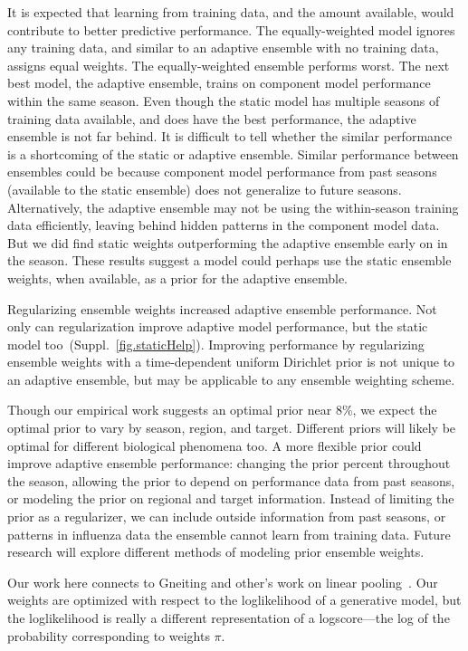\documentclass[12pt]{article}
\begin{document}
It is expected that learning from training data, and the amount available, would contribute to better predictive performance.
The equally-weighted model ignores any training data, and similar to an adaptive ensemble with no training data, assigns equal weights.
The equally-weighted ensemble performs worst.
The next best model, the adaptive ensemble, trains on component model performance within the same season.
Even though the static model has multiple seasons of training data available, and does have the best performance, the adaptive ensemble is not far behind.
It is difficult to tell whether the similar performance is a shortcoming of the static or adaptive ensemble.
Similar performance between ensembles could be because component model performance from past seasons (available to the static ensemble) does not generalize to future seasons.
Alternatively, the adaptive ensemble may not be using the within-season training data efficiently, leaving behind hidden patterns in the component model data. 
But we did find static weights outperforming the adaptive ensemble early on in the season.
These results suggest a model could perhaps use the static ensemble weights, when available, as a prior for the adaptive ensemble.

Regularizing ensemble weights increased adaptive ensemble performance.
Not only can regularization improve adaptive model performance, but the static model too~(Suppl.~\ref{fig.staticHelp}).
Improving performance by regularizing ensemble weights with a time-dependent uniform Dirichlet prior is not unique to an adaptive ensemble, but may be applicable to any ensemble weighting scheme. 

Though our empirical work suggests an optimal prior near 8\%, we expect the optimal prior to vary by season, region, and target.
Different priors will likely be optimal for different biological phenomena too.
%
A more flexible prior could improve adaptive ensemble performance:
changing the prior percent throughout the season, allowing the prior to depend on performance data from past seasons, or modeling the prior on regional and target information.
Instead of limiting the prior as a regularizer, we can include outside information from past seasons, or patterns in influenza data the ensemble cannot learn from training data.
Future research will explore different methods of modeling prior ensemble weights.

Our work here connects to Gneiting and other's work on linear pooling~\cite{ranjan2010combining,gneiting2013combining,geweke2011optimal,wallis2011combining}.
Our weights are optimized with respect to the loglikelihood of a generative model, but the loglikelihood is really a different representation of a logscore---the log of the probability corresponding to weights $\pi$.  
\end{document}
